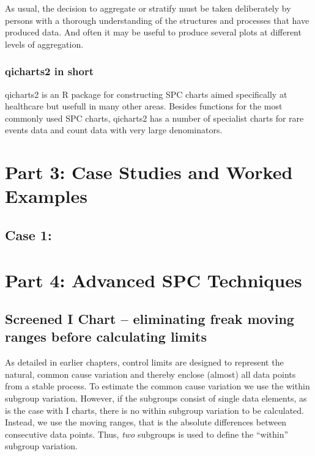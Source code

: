 \documentclass[
]{book}
\begin{document}
As usual, the decision to aggregate or stratify must be taken deliberately by persons with a thorough understanding of the structures and processes that have produced data. And often it may be useful to produce several plots at different levels of aggregation.

\section{qicharts2 in short}\label{qicharts2-in-short}

qicharts2 is an R package for constructing SPC charts aimed specifically at healthcare but usefull in many other areas. Besides functions for the most commonly used SPC charts, qicharts2 has a number of specialist charts for rare events data and count data with very large denominators.

\part*{Part 3: Case Studies and Worked Examples}\label{part-part-3-case-studies-and-worked-examples}

\chapter{Case 1:}\label{case-1}

\part*{Part 4: Advanced SPC Techniques}\label{part-part-4-advanced-spc-techniques}

\chapter{Screened I Chart -- eliminating freak moving ranges before calculating limits}\label{screenedmr}

As detailed in earlier chapters, control limits are designed to represent the natural, common cause variation and thereby enclose (almost) all data points from a stable process. To estimate the common cause variation we use the within subgroup variation. However, if the subgroups consist of single data elements, as is the case with I charts, there is no within subgroup variation to be calculated. Instead, we use the moving ranges, that is the absolute differences between consecutive data points. Thus, \emph{two} subgroups is used to define the ``within'' subgroup variation.
\end{document}
